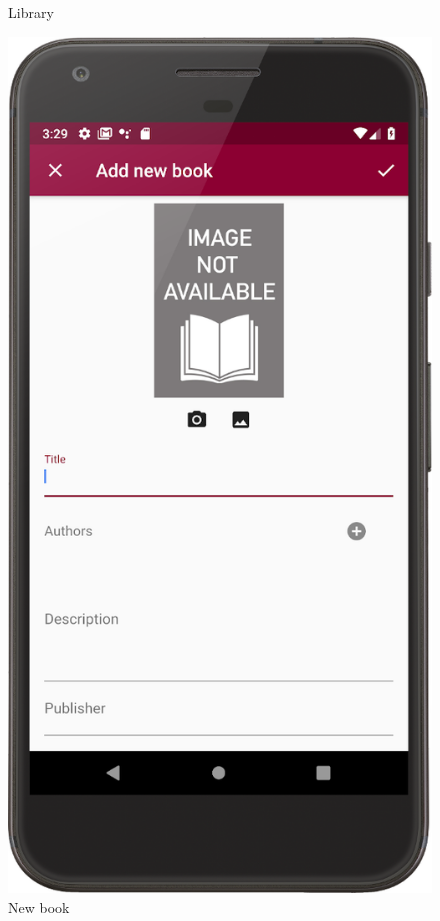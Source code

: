 \begin{figure}[!htb]
\begin{minipage}[b]{0.3\textwidth}
        \caption{Library}
        \label{ref:librarypage}
    \end{minipage}
    \hfill
    \begin{minipage}[b]{0.3\textwidth}
        \centering
        \includegraphics[scale=1]{images/add-new-book-dialog.png}
        \caption{New book}
        \label{ref:addnewbook}
    \end{minipage}
\end{figure}
